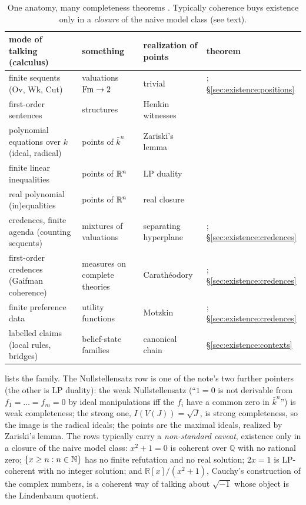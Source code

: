 \begin{table}[t]
\centering\small
\begin{tabularx}{\textwidth}{@{}>{\raggedright\arraybackslash}X>{\raggedright\arraybackslash}p{3.1cm}>{\raggedright\arraybackslash}p{2.9cm}>{\raggedright\arraybackslash}p{3.5cm}@{}}
\toprule
mode of talking (calculus) & something & realization of points & theorem\\
\midrule
finite sequents (Ov, Wk, Cut) & valuations $\mathrm{Fm}\to2$ & trivial & \citet{scott1974completeness}; \S\ref{sec:existence:positions}\\
first-order sentences & structures & Henkin witnesses & \citet{godel1930vollstandigkeit,henkin1949completeness}\\
polynomial equations over $k$ (ideal, radical) & points of $\bar k^n$ & Zariski's lemma & \citet{hilbert1893vollen,zariski1947new}\\
finite linear inequalities & points of $\mathbb{R}^n$ & LP duality & \citet{farkas1902theorie}\\
real polynomial (in)equalities & points of $\mathbb{R}^n$ & real closure & \citet{stengle1974nullstellensatz}\\
credences, finite agenda (counting sequents) & mixtures of valuations & separating hyperplane & \citet{definetti1937prevision}; \S\ref{sec:existence:credences}\\
first-order credences (Gaifman coherence) & measures on complete theories & Carath\'eodory & \citet{gaifman1964concerning}; \S\ref{sec:existence:credences}\\
finite preference data & utility functions & Motzkin & \citet{vonneumann1944theory}; \S\ref{sec:existence:credences}\\
labelled claims (local rules, bridges) & belief-state families & canonical chain & \S\ref{sec:existence:contexts}\\
\bottomrule
\end{tabularx}
\caption{One anatomy, many completeness theorems . Typically coherence buys existence only in a \emph{closure} of the naive model class (see text).}
\label{tab:existence:instances}
\end{table}

 lists the family. The Nullstellensatz row is one of the note's two further pointers (the other is LP duality): the weak Nullstellensatz (``$1=0$ is not derivable from $f_1=\dots=f_m=0$ by ideal manipulations iff the $f_i$ have a common zero in $\bar k^n$'') is weak completeness; the strong one, $I(V(J))=\sqrt J$, is strong completeness, so the image is the radical ideals; the points are the maximal ideals, realized by Zariski's lemma. The rows typically carry a \emph{non-standard caveat}, existence only in a closure of the naive model class: $x^2+1=0$ is coherent over $\mathbb Q$ with no rational zero; $\{x\ge n:n\in\mathbb{N}\}$ has no finite refutation and no real solution; $2x=1$ is LP-coherent with no integer solution; and $\mathbb R[x]/(x^2+1)$, Cauchy's construction of the complex numbers, is a coherent way of talking about $\sqrt{-1}$ whose object is the Lindenbaum quotient.

